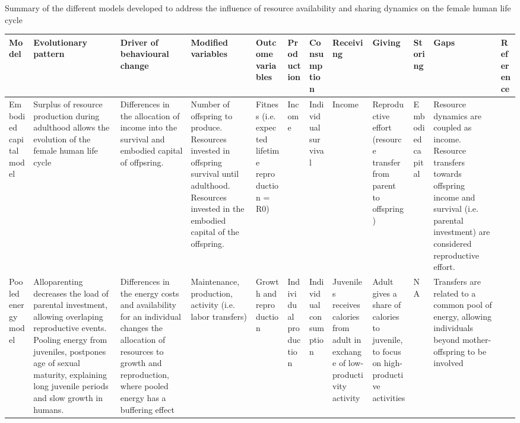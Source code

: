 \documentclass{article}
\begin{document}
\begin{sidewaysfigure}
\begin{figure}[H]
    \label{fig:2}
\end{figure}
\end{sidewaysfigure}

\begin{landscape}
    \centering
    \caption{Summary of the different models developed to address the influence of resource availability and sharing dynamics on the female human life cycle}
    \begin{longtable}{ p{} p{} p{} p{} p{} p{} p{} p{} p{} p{} p{} p{} }
    \hline
    Model & Evolutionary pattern & Driver of behavioural change & Modified variables & Outcome variables & Production & Consumption & Receiving & Giving & Storing & Gaps & Reference \\ 
    \hline
    Embodied capital model & Surplus of resource production during adulthood allows the evolution of the female human life cycle & Differences in the allocation of income into the survival and embodied capital of offpsring. & Number of offspring to produce. Resources invested in offspring survival until adulthood. Resources invested in the embodied capital of the offspring. & Fitness (i.e. expected lifetime reproduction = R0) & Income & Individual survival & Income & Reproductive effort (resource transfer from parent to offspring) & Embodied capital & Resource dynamics are coupled as income. Resource transfers towards offspring income and survival (i.e. parental investment) are considered reproductive effort. & \cite{kaplan1996theory,kaplan2000theory,kaplan2003embodied} \\ 
    Pooled energy model & Alloparenting decreases the load of parental investment, allowing overlaping reproductive events. Pooling energy from juveniles, postpones age of sexual maturity, explaining long juvenile periods and slow growth in humans. & Differences in the energy costs and availability for an individual changes the allocation of resources to growth and reproduction, where pooled energy has a buffering effect & Maintenance, production, activity (i.e. labor transfers) & Growth and reproduction & Individual production & Individual consumption & Juveniles receives calories from adult in exchange of low-productivity activity & Adult gives a share of calories to juvenile, to focus on high-productive activities & NA & Transfers are related to a common pool of energy, allowing individuals beyond mother-offspring to be involved & \cite{kramer2010pooled} \\  

\end{longtable}
\end{landscape}
\end{document}
